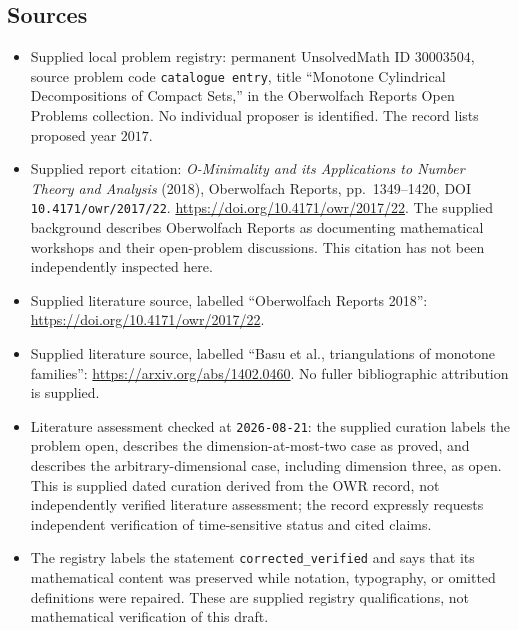 \documentclass[11pt]{article}
\begin{document}
\subsection{Sources}
\begin{itemize}
\item Supplied local problem registry: permanent UnsolvedMath ID \(30003504\), source problem code \texttt{catalogue entry}, title ``Monotone Cylindrical Decompositions of Compact Sets,'' in the Oberwolfach Reports Open Problems collection. No individual proposer is identified. The record lists proposed year \(2017\).
\item Supplied report citation: \emph{O-Minimality and its Applications to Number Theory and Analysis} (2018), Oberwolfach Reports, pp.\ 1349--1420, DOI \texttt{10.4171/owr/2017/22}. \url{https://doi.org/10.4171/owr/2017/22}. The supplied background describes Oberwolfach Reports as documenting mathematical workshops and their open-problem discussions. This citation has not been independently inspected here.
\item Supplied literature source, labelled ``Oberwolfach Reports 2018'': \url{https://doi.org/10.4171/owr/2017/22}.
\item Supplied literature source, labelled ``Basu et al., triangulations of monotone families'': \url{https://arxiv.org/abs/1402.0460}. No fuller bibliographic attribution is supplied.
\item Literature assessment checked at \texttt{2026-08-21}: the supplied curation labels the problem open, describes the dimension-at-most-two case as proved, and describes the arbitrary-dimensional case, including dimension three, as open. This is supplied dated curation derived from the OWR record, not independently verified literature assessment; the record expressly requests independent verification of time-sensitive status and cited claims.
\item The registry labels the statement \texttt{corrected\_verified} and says that its mathematical content was preserved while notation, typography, or omitted definitions were repaired. These are supplied registry qualifications, not mathematical verification of this draft.
\end{itemize}
\end{document}
